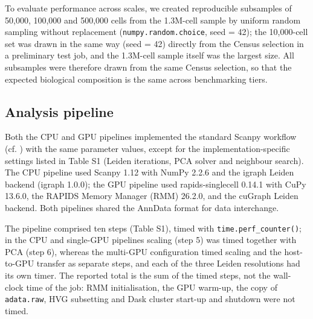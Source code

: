 \documentclass[runningheads]{llncs}
\begin{document}
To evaluate performance across scales, we created reproducible subsamples of 50,000, 100,000 and 500,000 cells from the 1.3M-cell sample by uniform random sampling without replacement (\texttt{numpy.random.choice}, seed = 42); the 10,000-cell set was drawn in the same way (seed = 42) directly from the Census selection in a preliminary test job, and the 1.3M-cell sample itself was the largest size.
All subsamples were therefore drawn from the same Census selection, so that the expected biological composition is the same across benchmarking tiers.

\hypertarget{analysis-pipeline}{%
\subsection{Analysis pipeline}\label{analysis-pipeline}}

Both the CPU and GPU pipelines implemented the standard Scanpy workflow (cf. \cite{Luecken2019,Heumos2023}) with the same parameter values, except for the implementation-specific settings listed in Table S1 (Leiden iterations, PCA solver and neighbour search).
The CPU pipeline used Scanpy 1.12 \cite{Wolf2018} with NumPy 2.2.6 and the igraph Leiden backend (igraph 1.0.0); the GPU pipeline used rapids-singlecell 0.14.1 \cite{Dicks2026} with CuPy 13.6.0, the RAPIDS Memory Manager (RMM) 26.2.0, and the cuGraph Leiden backend.
Both pipelines shared the AnnData format \cite{Virshup2024} for data interchange.

The pipeline comprised ten steps (Table S1), timed with \texttt{time.perf\_\allowbreak{}counter()}; in the CPU and single-GPU pipelines scaling (step 5) was timed together with PCA (step 6), whereas the multi-GPU configuration timed scaling and the host-to-GPU transfer as separate steps, and each of the three Leiden resolutions had its own timer. The reported total is the sum of the timed steps, not the wall-clock time of the job: RMM initialisation, the GPU warm-up, the copy of \texttt{adata.raw}, HVG subsetting and Dask cluster start-up and shutdown were not timed.
\end{document}
